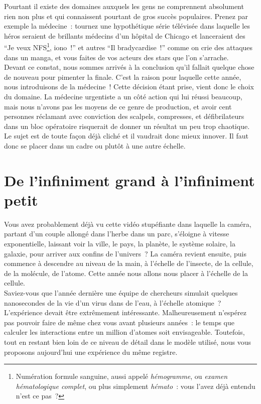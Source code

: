 Pourtant il existe des domaines auxquels les gens ne comprennent
absolument rien non plus et qui connaissent pourtant de gros succès
populaires. Prenez par exemple la médecine~: tournez une hypothétique
série télévisée dans laquelle les héros seraient de brillants médecins
d'un hôpital de Chicago et lanceraient des ``Je veux
NFS\footnote{Numération formule sanguine, aussi appelé
\emph{hémogramme}, ou \emph{examen hématologique complet}, ou plus
simplement \emph{hémato}~: vous l'avez déjà entendu n'est ce pas~?},
iono~!'' et autres ``Il bradycardise~!'' comme on crie des attaques dans un manga, et vous faites
de vos acteurs des stars que l'on s'arrache.\\

Devant ce constat, nous sommes arrivés à la conclusion qu'il fallait
quelque chose de nouveau pour pimenter la finale. C'est la raison pour
laquelle cette année, nous introduisons de la médecine~! Cette
décision étant prise, vient donc le choix du domaine. La médecine
urgentiste a un côté action qui lui réussi beaucoup, mais nous n'avons
pas les moyens de ce genre de production, et avoir cent personnes
réclamant avec conviction des scalpels, compresses, et défibrilateurs
dans un bloc opératoire risquerait de donner un résultat un peu trop
chaotique. Le sujet est de toute façon déjà cliché et il vaudrait donc
mieux innover. Il faut donc se placer dans un cadre ou plutôt à une
autre échelle.\\


\section{De l'infiniment grand à l'infiniment petit}

Vous avez probablement déjà vu cette vidéo stupéfiante dans laquelle
la caméra, partant d'un couple allongé dans l'herbe dans un parc,
s'éloigne à vitesse exponentielle, laissant voir la ville, le pays, la
planète, le système solaire, la galaxie, pour arriver aux confins de
l'univers~?  La caméra revient ensuite, puis commence à descendre au
niveau de la main, à l'échelle de l'insecte, de la cellule, de la
molécule, de l'atome. Cette année nous allons nous placer à l'échelle
de la cellule.\\

Saviez-vous que l'année dernière une équipe de chercheurs simulait
quelques nanosecondes de la vie d'un virus dans de l'eau, à l'échelle
atomique~? L'expérience devait être extrêmement intéressante.
Malheureusement n'espérez pas pouvoir faire de même chez vous avant
plusieurs années~: le temps que calculer les interactions entre un
million d'atomes soit envisageable. Toutefois, tout en restant bien
loin de ce niveau de détail dans le modèle utilisé, nous vous
proposons aujourd'hui une expérience du même registre.\\

